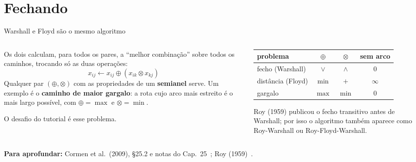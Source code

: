 \documentclass[aspectratio=169,xcolor=table]{beamer}
\newcommand{\fonte}[1]{%
  \vfill
  {\tiny\color{gray!55!black}\textbf{Para aprofundar:} #1\par}%
}
\begin{document}
\section{Fechando}

\begin{frame}{Warshall e Floyd são o mesmo algoritmo}
  \begin{columns}[c]
    \begin{column}{0.52\textwidth}
      \scriptsize Os dois calculam, para todos os pares, a ``melhor combinação'' sobre todos os
      caminhos, trocando só as duas operações:
      \[ x_{ij} \leftarrow x_{ij} \oplus (x_{ik} \otimes x_{kj}) \]
      Qualquer par $(\oplus, \otimes)$ com as propriedades de um \textbf{semianel} serve. Um
      exemplo é o \textbf{caminho de maior gargalo}: a rota cujo arco mais estreito é o mais
      largo possível, com $\oplus = \max$ e $\otimes = \min$.
      \medskip

      O desafio do tutorial é esse problema.
    \end{column}
    \begin{column}{0.44\textwidth}
      \centering\scriptsize
      \begin{tabular}{lccc}
        \toprule
        problema & $\oplus$ & $\otimes$ & sem arco \\
        \midrule
        fecho (Warshall) & $\lor$ & $\land$ & $0$ \\
        distância (Floyd) & $\min$ & $+$ & $\infty$ \\
        gargalo & $\max$ & $\min$ & $0$ \\
        \bottomrule
      \end{tabular}
      \medskip

      {\tiny Roy (1959) publicou o fecho transitivo antes de Warshall; por isso o
      algoritmo também aparece como Roy-Warshall ou Roy-Floyd-Warshall.\par}
    \end{column}
  \end{columns}
  \fonte{Cormen et al.\ (2009), \S 25.2 e notas do Cap.\ 25~\cite{cormen2009introduction};
    Roy (1959)~\cite{roy1959transitivite}.}
\end{frame}
\end{document}
